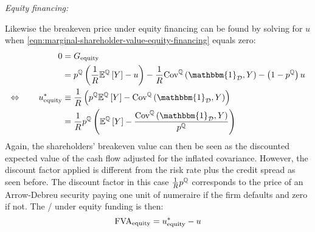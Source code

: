 \documentclass[main.tex]{subfiles}
\begin{document}
            \noindent
            \textit{Equity financing:} \par
            Likewise the breakeven price under equity financing can be found by solving for $u$
            when \cref{eqn:marginal-shareholder-value-equity-financing} equals zero:
                \begin{align}
                    0 &= G_{\text{equity}} 
                        \nonumber \\
                    &=
                        p^{\mathbb{Q}} \left(
                            \discountfactor
                            \mathbb{E}^{\mathbb{Q}}\left[Y\right]
                            - u
                        \right)
                        -
                        \discountfactor
                        \text{Cov}^{\mathbb{Q}}\left(\mathbbm{1}_{\mathcal{D}}, Y\right) 
                        - 
                        \left(
                            1
                            -
                            p^{\mathbb{Q}}
                        \right)
                        u 
                        \nonumber \\
                    \Leftrightarrow \qquad
                    u_{\text{equity}}^{\ast}
                    &\equiv
                        \discountfactor
                        \left(
                            p^{\mathbb{Q}}
                            \mathbb{E}^{\mathbb{Q}}\left[Y\right]
                            -
                            \text{Cov}^{\mathbb{Q}}\left(\mathbbm{1}_{\mathcal{D}}, Y\right) 
                        \right)
                        \nonumber \\
                    &= 
                        \discountfactor
                        p^{\mathbb{Q}}
                        \left(
                            \mathbb{E}^{\mathbb{Q}}\left[Y\right]
                            -
                            \frac{
                                \text{Cov}^{\mathbb{Q}}\left(\mathbbm{1}_{\mathcal{D}}, Y\right)
                            }{
                                p^{\mathbb{Q}}  
                            }  
                        \right)
                    \label{eqn:shareholders-breakeven-equity-financing}
                \end{align}
            Again, the shareholders' breakeven value can then be seen as the discounted expected value of the cash flow
            adjusted for the inflated covariance.
            However, the discount factor applied is different from the risk rate plus the credit spread as seen before.
            The discount factor in this case $\frac{1}{R} p^{\mathbb{Q}}$ corresponds to 
            the price of an Arrow-Debreu security paying one unit of numeraire if the firm defaults and zero if not.
            The \FVA/ under equity funding is then:
                \begin{equation}
                    \FVA/_{\text{equity}} 
                        = u^{\ast}_{\text{equity}} - u
                    \label{eqn:fva-equity-financing}
                \end{equation}
\end{document}
